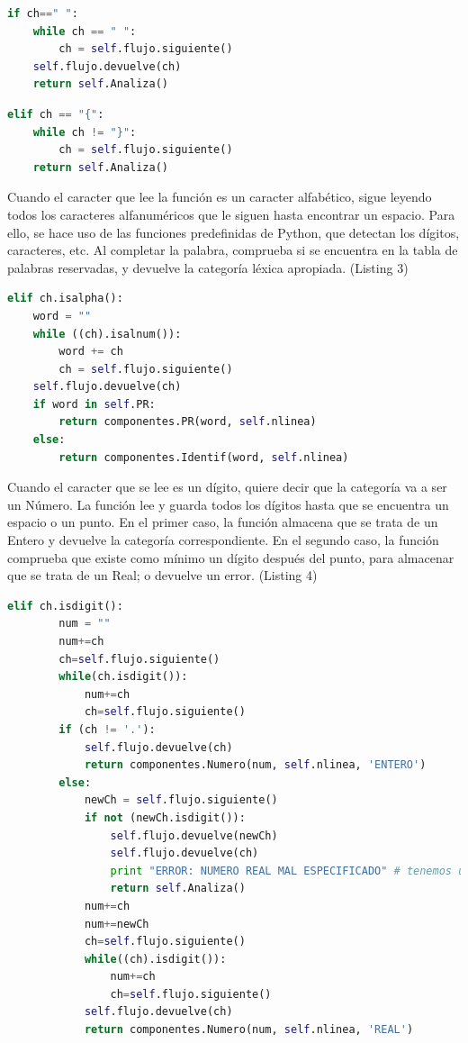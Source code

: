 \documentclass[11pt]{article}
\begin{document}
\begin{lstlisting}[language=Python, caption=Omisión de espacios]
	if ch==" ":
    while ch == " ":
    	ch = self.flujo.siguiente()
    self.flujo.devuelve(ch)
    return self.Analiza()
\end{lstlisting}

\begin{lstlisting}[language=Python, caption=Tratamiento de comentarios]
	elif ch == "{":
    while ch != "}":
    	ch = self.flujo.siguiente()
    return self.Analiza()
\end{lstlisting}

Cuando el caracter que lee la función es un caracter alfabético, sigue leyendo todos los caracteres alfanuméricos que le siguen hasta encontrar un espacio. Para ello, se hace uso de las funciones predefinidas de Python, que detectan los dígitos, caracteres, etc. Al completar la palabra, comprueba si se encuentra en la tabla de palabras reservadas, y devuelve la categoría léxica apropiada. (Listing 3)

\begin{lstlisting}[language=Python, caption=Detección de palabras]
	elif ch.isalpha():
    word = ""
    while ((ch).isalnum()):
    	word += ch
    	ch = self.flujo.siguiente()
    self.flujo.devuelve(ch)
    if word in self.PR:
    	return componentes.PR(word, self.nlinea)
    else:
    	return componentes.Identif(word, self.nlinea)
\end{lstlisting}

Cuando el caracter que se lee es un dígito, quiere decir que la categoría va a ser un Número. La función lee y guarda todos los dígitos hasta que se encuentra un espacio o un punto. En el primer caso, la función almacena que se trata de un Entero y devuelve la categoría correspondiente. En el segundo caso, la función comprueba que existe como mínimo un dígito después del punto, para almacenar que se trata de un Real; o devuelve un error. (Listing 4) 

\begin{minipage}{\linewidth}
	\begin{lstlisting}[language=Python, caption=Detección de números]
		elif ch.isdigit():
		num = ""
		num+=ch
		ch=self.flujo.siguiente()
		while(ch.isdigit()):
			num+=ch
			ch=self.flujo.siguiente()
		if (ch != '.'):
			self.flujo.devuelve(ch)
			return componentes.Numero(num, self.nlinea, 'ENTERO')
		else:
			newCh = self.flujo.siguiente()
			if not (newCh.isdigit()):
				self.flujo.devuelve(newCh)
				self.flujo.devuelve(ch)
				print "ERROR: NUMERO REAL MAL ESPECIFICADO" # tenemos un comentario no abierto
				return self.Analiza()
			num+=ch
			num+=newCh
			ch=self.flujo.siguiente()
			while((ch).isdigit()):
				num+=ch
				ch=self.flujo.siguiente()
			self.flujo.devuelve(ch)
			return componentes.Numero(num, self.nlinea, 'REAL')
	\end{lstlisting}
\end{minipage}
\end{document}
